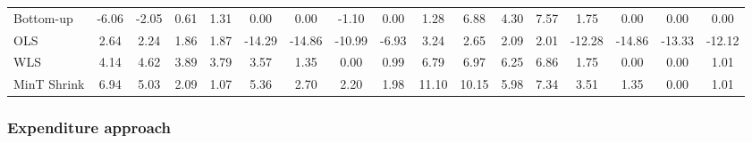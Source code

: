 \documentclass[graybox]{svmult}
\begin{document}
\begin{table}[H]
{\begin{tabular}{@{}lSSSSSSSSSSSSSSSS@{}}
			Bottom-up & -6.06 & -2.05 & 0.61 & 1.31 & 0.00 & 0.00 & -1.10 & 0.00 & 1.28 & 6.88 & 4.30 & 7.57 & 1.75 & 0.00 & 0.00 & 0.00\\
			
			OLS & 2.64 & 2.24 & 1.86 & 1.87 & -14.29 & -14.86 & -10.99 & -6.93 & 3.24 & 2.65 & 2.09 & 2.01 & -12.28 & -14.86 & -13.33 & -12.12\\
			
			WLS & 4.14 & 4.62 & 3.89 & 3.79 & 3.57 & 1.35 & 0.00 & 0.99 & 6.79 & 6.97 & 6.25 & 6.86 & 1.75 & 0.00 & 0.00 & 1.01\\
			
			MinT Shrink & 6.94 & 5.03 & 2.09 & 1.07 & 5.36 & 2.70 & 2.20 & 1.98 & 11.10 & 10.15 & 5.98 & 7.34 & 3.51 & 1.35 & 0.00 & 1.01\\
			\bottomrule
		\end{tabular}
	}
\end{table}

\subsubsection{Expenditure approach}
\end{document}

